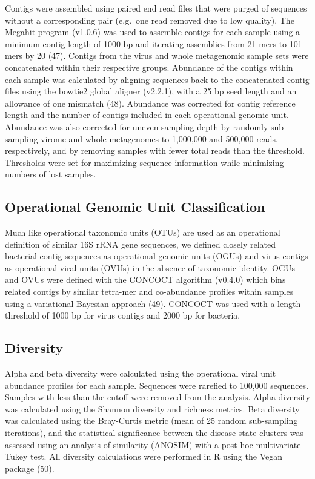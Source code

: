 \documentclass[12pt,]{article}
\begin{document}
Contigs were assembled using paired end read files that were purged of
sequences without a corresponding pair (e.g.~one read removed due to low
quality). The Megahit program (v1.0.6) was used to assemble contigs for
each sample using a minimum contig length of 1000 bp and iterating
assemblies from 21-mers to 101-mers by 20 (47). Contigs from the virus
and whole metagenomic sample sets were concatenated within their
respective groups. Abundance of the contigs within each sample was
calculated by aligning sequences back to the concatenated contig files
using the bowtie2 global aligner (v2.2.1), with a 25 bp seed length and
an allowance of one mismatch (48). Abundance was corrected for contig
reference length and the number of contigs included in each operational
genomic unit. Abundance was also corrected for uneven sampling depth by
randomly sub-sampling virome and whole metagenomes to 1,000,000 and
500,000 reads, respectively, and by removing samples with fewer total
reads than the threshold. Thresholds were set for maximizing sequence
information while minimizing numbers of lost samples.

\subsection{Operational Genomic Unit
Classification}\label{operational-genomic-unit-classification}

Much like operational taxonomic units (OTUs) are used as an operational
definition of similar 16S rRNA gene sequences, we defined closely
related bacterial contig sequences as operational genomic units (OGUs)
and virus contigs as operational viral units (OVUs) in the absence of
taxonomic identity. OGUs and OVUs were defined with the CONCOCT
algorithm (v0.4.0) which bins related contigs by similar tetra-mer and
co-abundance profiles within samples using a variational Bayesian
approach (49). CONCOCT was used with a length threshold of 1000 bp for
virus contigs and 2000 bp for bacteria.

\subsection{Diversity}\label{diversity}

Alpha and beta diversity were calculated using the operational viral
unit abundance profiles for each sample. Sequences were rarefied to
100,000 sequences. Samples with less than the cutoff were removed from
the analysis. Alpha diversity was calculated using the Shannon diversity
and richness metrics. Beta diversity was calculated using the
Bray-Curtis metric (mean of 25 random sub-sampling iterations), and the
statistical significance between the disease state clusters was assessed
using an analysis of similarity (ANOSIM) with a post-hoc multivariate
Tukey test. All diversity calculations were performed in R using the
Vegan package (50).
\end{document}
